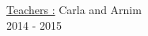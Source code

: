 \begin{titlepage}
\begin{center}
        \vspace{0.8cm}
        \Large
        \underline{Teachers :} Carla and Arnim\\
        \vspace{0.5cm}
        2014 - 2015%
        
    \end{center}
\end{titlepage}